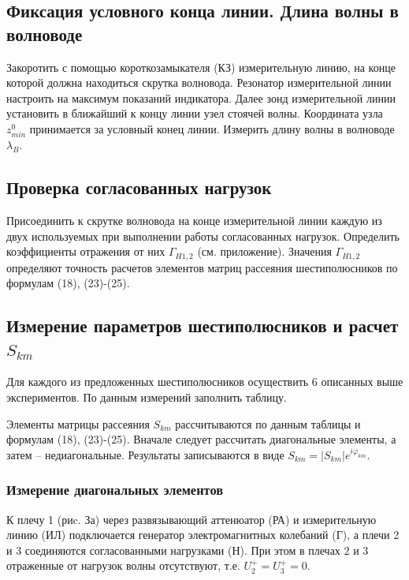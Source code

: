 \documentclass[a4paper,12pt]{article}
\begin{document}
\subsection{Фиксация условного конца линии. Длина волны в волноводе}

Закоротить с помощью короткозамыкателя (КЗ) измерительную линию, на конце которой должна находиться скрутка волновода. Резонатор измерительной линии настроить на максимум показаний индикатора. Далее зонд измерительной линии установить в ближайший к концу линии узел стоячей волны. Координата узла $z^0_{min}$ принимается за условный конец линии. Измерить длину волны в волноводе $\lambda_B$.

\subsection{Проверка согласованных нагрузок}

Присоединить к скрутке волновода на конце измерительной линии каждую из двух используемых при выполнении работы согласованных нагрузок. Определить коэффициенты отражения от них $\Gamma_{H1,2}$ (см. приложение). Значения  $\Gamma_{H1,2}$ определяют точность расчетов элементов матриц рассеяния шестиполюсников по формулам (18), (23)-(25).

\subsection{Измерение параметров шестиполюсников и расчет $S_{km}$}

Для каждого из предложенных шестиполюсников осуществить 6 описанных выше экспериментов. По данным измерений заполнить таблицу.

	Элементы матрицы рассеяния $S_{km}$ рассчитываются по данным таблицы и формулам (18), (23)-(25). Вначале следует рассчитать диагональные элементы, а затем -- недиагональные. Результаты записываются в виде $S _ { k m } = \left| S _ { k m } \right| e ^ { i \varphi _ { k m } }$.

\subsubsection{Измерение диагональных элементов}
К плечу 1 (риc. За) через развязывающий аттенюатор (РА) и измерительную линию (ИЛ) подключается генератор электромагнитных  колебаний (Г), а плечи 2 и 3 соединяются согласованными нагрузками (Н). 
При этом в плечах 2 и 3 отраженные от нагрузок волны отсутствуют, т.е. $U _ { 2 } ^ { + } = U _ { 3 } ^ { + } = 0$.
\end{document}
